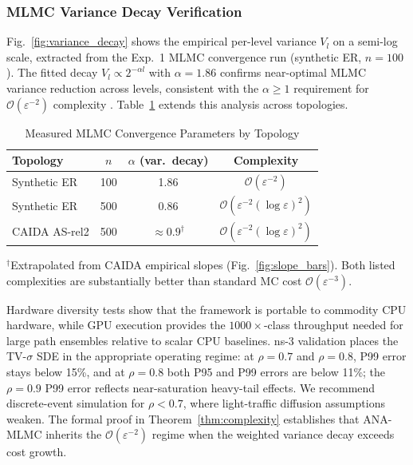 \documentclass[journal]{IEEEtran}
\begin{document}
\subsubsection{MLMC Variance Decay Verification}

Fig.~\ref{fig:variance_decay} shows the empirical per-level variance $V_l$ on a semi-log scale,
extracted from the Exp.~1 MLMC convergence run (synthetic ER, $n=100$). The fitted decay
$V_l\propto2^{-\alpha l}$ with $\alpha=1.86$ confirms near-optimal MLMC variance reduction
across levels, consistent with the $\alpha\geq1$ requirement for
$\mathcal{O}(\varepsilon^{-2})$ complexity \cite{giles2015multilevel}.
Table~\ref{tab:mlmc_convergence_params} extends this analysis across topologies.

\begin{table}[!t]
\caption{Measured MLMC Convergence Parameters by Topology}
\label{tab:mlmc_convergence_params}
\centering
\begin{tabular}{@{}l c c c@{}}
\toprule
Topology & $n$ & $\alpha$ (var.\ decay) & Complexity \\
\midrule
Synthetic ER & 100 & 1.86 & $\mathcal{O}(\varepsilon^{-2})$ \\
Synthetic ER & 500 & 0.86 & $\mathcal{O}(\varepsilon^{-2}(\log\varepsilon)^2)$ \\
CAIDA AS-rel2 & 500 & $\approx0.9^\dagger$ & $\mathcal{O}(\varepsilon^{-2}(\log\varepsilon)^2)$ \\
\bottomrule
\end{tabular}
\vspace{2pt}
\footnotesize
$^\dagger$Extrapolated from CAIDA empirical slopes (Fig.~\ref{fig:slope_bars}). Both listed
complexities are substantially better than standard MC cost $\mathcal{O}(\varepsilon^{-3})$.
\end{table}

Hardware diversity tests show that the framework is portable to commodity CPU hardware, while
GPU execution provides the $1000\times$-class throughput needed for large path ensembles relative
to scalar CPU baselines. ns-3 validation places the TV-$\sigma$ SDE in the appropriate operating
regime: at $\rho=0.7$ and $\rho=0.8$, P99 error stays below 15\%, and at $\rho=0.8$ both P95 and
P99 errors are below 11\%; the $\rho=0.9$ P99 error reflects near-saturation heavy-tail effects.
We recommend discrete-event simulation for $\rho<0.7$, where light-traffic diffusion assumptions
weaken. The formal proof in Theorem~\ref{thm:complexity} establishes that ANA-MLMC inherits the
$\mathcal{O}(\varepsilon^{-2})$ regime when the weighted variance decay exceeds cost growth.
\end{document}
